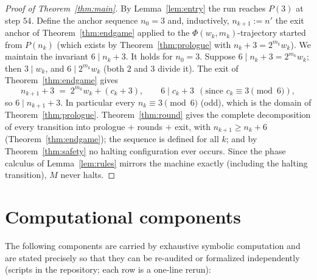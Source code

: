 \documentclass[11pt]{amsart}
\theoremstyle{definition}
\begin{document}
\begin{proof}[Proof of Theorem~\ref{thm:main}]
By Lemma~\ref{lem:entry} the run reaches $P(3)$ at step $54$. Define the
anchor sequence $n_0=3$ and, inductively, $n_{k+1}:=n'$ the exit anchor of
Theorem~\ref{thm:endgame} applied to the $\Phi(w_k,m_k)$-trajectory started
from $P(n_k)$ (which exists by Theorem~\ref{thm:prologue} with
$n_k+3=2^{m_k}w_k$). We maintain the invariant $6\mid n_k+3$. It holds
for $n_0=3$. Suppose $6\mid n_k+3=2^{m_k}w_k$; then $3\mid w_k$, and
$6\mid 2^{m_k}w_k$ (both $2$ and $3$ divide it). The exit of
Theorem~\ref{thm:endgame} gives
\[
n_{k+1}+3 \;=\; 2^{m_k}w_k+(c_k+3),\qquad 6\mid c_k+3\ \ (\text{since } c_k\equiv3\pmod6),
\]
so $6\mid n_{k+1}+3$. In particular every $n_k\equiv3\pmod6$ (odd), which
is the domain of Theorem~\ref{thm:prologue}.
Theorem~\ref{thm:round} gives the complete decomposition of every
transition into prologue $+$ rounds $+$ exit, with
$n_{k+1}\ge n_k+6$ (Theorem~\ref{thm:endgame}); the sequence is defined for
all $k$; and by Theorem~\ref{thm:safety} no halting configuration ever
occurs. Since the phase calculus of Lemma~\ref{lem:rules} mirrors the
machine exactly (including the halting transition), $M$ never halts.
\end{proof}

\section{Computational components}\label{s:comp}

The following components are carried by exhaustive symbolic computation and
are stated precisely so that they can be re-audited or formalized
independently (scripts in the repository; each row is a one-line rerun):
\end{document}
